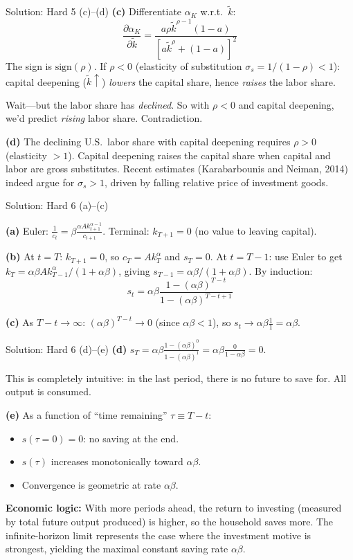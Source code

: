\documentclass[aspectratio=169,10pt]{beamer}
\newcommand{\backbutton}[1]{\hfill\hyperlink{#1}{\beamerbutton{Back}}}
\begin{document}
\begin{frame}{Solution: Hard 5 (c)--(d)}
\textbf{(c)} Differentiate $\alpha_K$ w.r.t.\ $\tilde{k}$:
\[
\frac{\partial\alpha_K}{\partial\tilde{k}} = \frac{a\rho\tilde{k}^{\rho-1}(1-a)}{[a\tilde{k}^\rho+(1-a)]^2}
\]
The sign is $\text{sign}(\rho)$. If $\rho<0$ (elasticity of substitution $\sigma_s = 1/(1-\rho)<1$): capital deepening ($\tilde{k}\uparrow$) \emph{lowers} the capital share, hence \emph{raises} the labor share.

Wait---but the labor share has \emph{declined}. So with $\rho<0$ and capital deepening, we'd predict \emph{rising} labor share. Contradiction.

\medskip
\textbf{(d)} The declining U.S.\ labor share with capital deepening requires $\rho>0$ (elasticity $>1$). Capital deepening raises the capital share when capital and labor are gross substitutes. Recent estimates (Karabarbounis and Neiman, 2014) indeed argue for $\sigma_s > 1$, driven by falling relative price of investment goods.
\backbutton{q-h5}
\end{frame}

\begin{frame}{Solution: Hard 6 (a)--(c)}
\hypertarget{s-h6}{}

\textbf{(a)} Euler: $\frac{1}{c_t} = \beta\frac{\alpha Ak_{t+1}^{\alpha-1}}{c_{t+1}}$. Terminal: $k_{T+1}=0$ (no value to leaving capital).

\medskip
\textbf{(b)} At $t=T$: $k_{T+1}=0$, so $c_T=Ak_T^\alpha$ and $s_T=0$. At $t=T-1$: use Euler to get $k_T = \alpha\beta Ak_{T-1}^\alpha/(1+\alpha\beta)$, giving $s_{T-1} = \alpha\beta/(1+\alpha\beta)$. By induction:
\[
s_t = \alpha\beta\frac{1-(\alpha\beta)^{T-t}}{1-(\alpha\beta)^{T-t+1}}
\]

\textbf{(c)} As $T-t \to \infty$: $(\alpha\beta)^{T-t}\to 0$ (since $\alpha\beta<1$), so $s_t \to \alpha\beta\frac{1}{1} = \alpha\beta$.
\end{frame}

\begin{frame}{Solution: Hard 6 (d)--(e)}
\textbf{(d)} $s_T = \alpha\beta\frac{1-(\alpha\beta)^0}{1-(\alpha\beta)^1} = \alpha\beta\frac{0}{1-\alpha\beta} = 0$.

This is completely intuitive: in the last period, there is no future to save for. All output is consumed.

\medskip
\textbf{(e)} As a function of ``time remaining'' $\tau \equiv T-t$:
\begin{itemize}
  \item $s(\tau=0) = 0$: no saving at the end.
  \item $s(\tau)$ increases monotonically toward $\alpha\beta$.
  \item Convergence is geometric at rate $\alpha\beta$.
\end{itemize}

\textbf{Economic logic:} With more periods ahead, the return to investing (measured by total future output produced) is higher, so the household saves more. The infinite-horizon limit represents the case where the investment motive is strongest, yielding the maximal constant saving rate $\alpha\beta$.
\backbutton{q-h6}
\end{frame}
\end{document}
